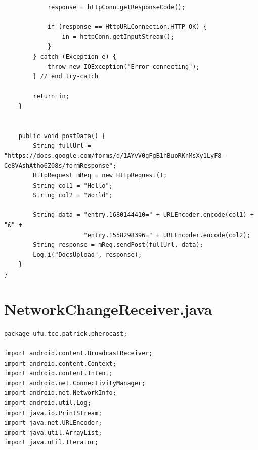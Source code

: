 \documentclass[12pt, %
openright, 
oneside,
a4paper,
brazil]{facom-ufu-abntex2}
\begin{document}
\begin{anexosenv}
\begin{lstlisting}
            response = httpConn.getResponseCode();                 

            if (response == HttpURLConnection.HTTP_OK) {
                in = httpConn.getInputStream();                                 
            }                     
        } catch (Exception e) {
            throw new IOException("Error connecting");            
        } // end try-catch

        return in;     
    }
    

	public void postData() {
		String fullUrl = "https://docs.google.com/forms/d/1AYvV0gFgB1hBuoRKnMsXy1LyF8-Ce8VAshAtho6Z08s/formResponse";
		HttpRequest mReq = new HttpRequest();
		String col1 = "Hello";
		String col2 = "World";

		String data = "entry.1680144410=" + URLEncoder.encode(col1) + "&" + 
					  "entry.1558298396=" + URLEncoder.encode(col2);
		String response = mReq.sendPost(fullUrl, data);
		Log.i("DocsUpload", response);
	} 
}

\end{lstlisting}
\section{NetworkChangeReceiver.java}
\begin{lstlisting}
package ufu.tcc.patrick.pherocast;

import android.content.BroadcastReceiver;
import android.content.Context;
import android.content.Intent;
import android.net.ConnectivityManager;
import android.net.NetworkInfo;
import android.util.Log;
import java.io.PrintStream;
import java.net.URLEncoder;
import java.util.ArrayList;
import java.util.Iterator;


\end{lstlisting}
\end{anexosenv}
\end{document}

